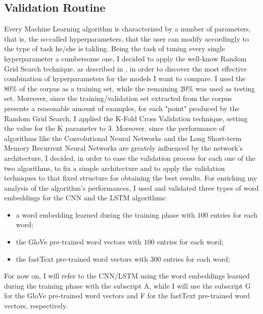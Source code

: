 \documentclass[11pt,twocolumn]{article}
\begin{document}
        \subsection{Validation Routine} %
        \label{sub:validation_routine}
            Every Machine Learning algorithm is characterized by a number of parameters, that is, the
            so-called hyperparameters, that the user can modify accordingly to the type of task he/she is
            takling. Being the task of tuning every single hyperparameter a cumbersome one, I decided to
            apply the well-know Random Grid Search technique, as described in \cite{random_grid_search}, in
            order to discover the most effective combination of hyperparameters for the models I want to
            compare. I used the $80\%$ of the corpus as a training set, while the remaining $20\%$ was used as
            testing set. Moreover, since the training/validation set extracted from the corpus
            presents a reasonable amount of examples, for each "point" produced by the Random Grid Search, I
            applied the K-Fold Cross Validation technique, setting the value for the K parameter to $3$.
            Moreover, since the performance of algorithms like the Convolutional Neural Networks and the
            Long Short-term Memory Recurrent Neural Networks are greately influenced by the network's
            architecture, I decided, in order to ease the validation process for each one of the two
            algorithms, to fix a simple architecture and to apply the validation techniques to that fixed
            structure for obtaining the best results. For enriching my analysis of the algorithm's performances,
            I used and validated three types of word embeddings for the CNN and the LSTM algorithms:

            \begin{itemize}
                \item a word embedding learned during the training phase with $100$ entries for each word;
                \item the GloVe \cite{glove} pre-trained word vectors with $100$ entries for each word;
                \item the fastText \cite{fasttext} pre-trained word vectors with $300$ entries for each
                word;
            \end{itemize}

            \noindent
            For now on, I will refer to the CNN/LSTM using the word embeddings learned during the training
            phase with the subscript A, while I will use the subscript G for the GloVe pre-trained word
            vectors and F for the fastText pre-trained word vectors, respectively.
\end{document}
